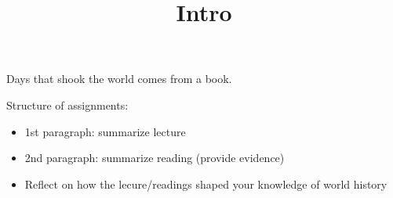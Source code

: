 \documentclass{article}
\begin{document}
\title{Intro}
 Days that shook the world comes from a book.

Structure of assignments:
\begin{itemize}
	\item 1st paragraph: summarize lecture
	\item 2nd paragraph: summarize reading (provide evidence)
	\item Reflect on how the lecure/readings shaped your knowledge of world history
\end{itemize}
\end{document}
